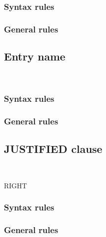 \subsubsection{Syntax rules}

\subsubsection{General rules}

\subsection{Entry name}
\begin{syntax}
  \begin{0-1}
     \\
    \identifier
  \end{0-1}
\end{syntax}

\subsubsection{Syntax rules}

\subsubsection{General rules}

\subsection{JUSTIFIED clause}
\begin{syntax}
  \begin{1=}
     \\
  \end{1=}
  RIGHT
\end{syntax}

\subsubsection{Syntax rules}

\subsubsection{General rules}

